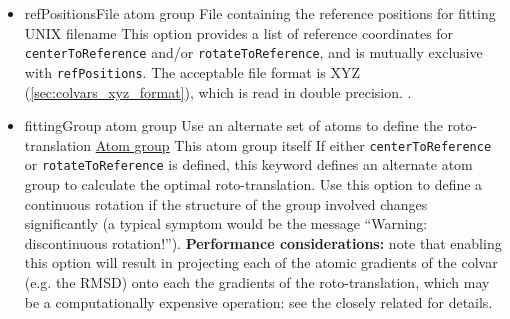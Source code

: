 \begin{itemize}
\item %
  \key%
    {refPositionsFile}{%
    atom group}{%
    File containing the reference positions for fitting}{%
    UNIX filename}{%
    \label{key:colvars:atom_group:refPositionsFile}
    This option provides a list of reference coordinates for \texttt{centerToReference} and/or \texttt{rotateToReference}, and is mutually exclusive with \texttt{refPositions}.
    The acceptable file format is XYZ (\ref{sec:colvars_xyz_format}), which is read in double precision.
    .
}



\item %
  \keydef%
    {fittingGroup}{%
    atom group}{%
    Use an alternate set of atoms to define the roto-translation}{%
    \hyperref[sec:colvar_atom_groups]{Atom group}}{%
    This atom group itself}{%
    If either \texttt{centerToReference} or \texttt{rotateToReference} is defined, this keyword defines an alternate atom group to calculate the optimal roto-translation.
    Use this option to define a continuous rotation if the structure of the group involved changes significantly (a typical symptom would be the message ``Warning: discontinuous rotation!'').
    \textbf{Performance considerations:} note that enabling this option will result in projecting each of the atomic gradients of the colvar (e.g.{} the RMSD) onto each the gradients of the roto-translation, which may be a computationally expensive operation: see the closely related  for details.%
}

\end{itemize}

